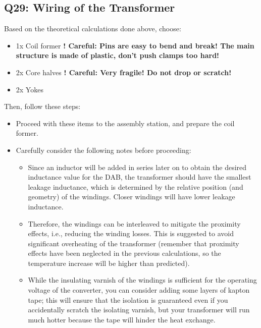 \documentclass{PELsmallreport}
\begin{document}
\subsection{Q29: Wiring of the Transformer} 
Based on the theoretical calculations done above, choose:  
\begin{itemize}
    \item 1x Coil former \textbf{! Careful: Pins are easy to bend and break! The main structure is made of plastic, don't push clamps too hard!}
    \item 2x Core halves \textbf{! Careful: Very fragile! Do not drop or scratch!}
    \item 2x Yokes
\end{itemize}
Then, follow these steps:
\begin{itemize}
    \item Proceed with these items to the assembly station, and prepare the coil former. 
    \item Carefully consider the following notes before proceeding:
    \begin{itemize}
        \item Since an inductor will be added in series later on to obtain the desired inductance value for the DAB, the transformer should have the smallest leakage inductance, which is determined by the relative position (and geometry) of the windings. Closer windings will have lower leakage inductance.
        \item Therefore, the windings can be interleaved to mitigate the proximity effects, i.e., reducing the winding losses. This is suggested to avoid significant overheating of the transformer (remember that proximity effects have been neglected in the previous calculations, so the temperature increase will be higher than predicted).
        \item While the insulating varnish of the windings is sufficient for the operating voltage of the converter, you can consider adding some layers of kapton tape; this will ensure that the isolation is guaranteed even if you accidentally scratch the isolating varnish, but your transformer will run much hotter because the tape will hinder the heat exchange.
    \end{itemize}
    

\end{itemize}
\end{document}
